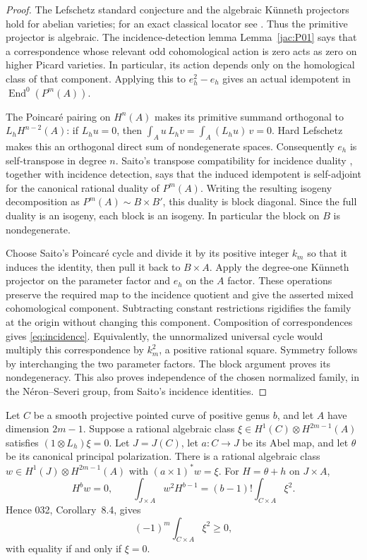 \begin{proof}
The Lefschetz standard conjecture and the algebraic K\"unneth projectors
hold for abelian varieties; for an exact classical locator see
\cite[Theorem~2A11]{Kleiman68}. Thus the primitive projector is algebraic.
The incidence-detection lemma Lemma~\ref{jac:P01} says that a correspondence
whose relevant odd cohomological action is zero acts as zero on higher
Picard varieties. In particular, its action depends only on the
homological class of that component. Applying this to $e_h^2-e_h$ gives
an actual idempotent in $\operatorname{End}^0(P^m(A))$.

The Poincar\'e pairing on $H^n(A)$ makes its primitive summand orthogonal
to $L_hH^{n-2}(A)$: if $L_hu=0$, then
$\int_Au\,L_hv=\int_A(L_hu)\,v=0$.
Hard Lefschetz makes this an orthogonal direct sum of nondegenerate
spaces. Consequently $e_h$ is self-transpose in degree $n$. Saito's
transpose compatibility for incidence duality
\cite[Proposition~4.4, especially (4.4.1)--(4.4.2)]{Saito1979}, together
with incidence detection, says that the induced idempotent is
self-adjoint for the canonical rational duality of $P^m(A)$.
Writing the resulting isogeny decomposition as
$P^m(A)\sim B\times B'$, this duality is block diagonal. Since the full
duality is an isogeny, each block is an isogeny. In particular the block
on $B$ is nondegenerate.

Choose Saito's Poincar\'e cycle and divide it by its positive integer
$k_m$ so that it induces the identity, then pull it back to $B\times A$.
Apply the degree-one K\"unneth projector on the parameter factor and
$e_h$ on the $A$ factor. These operations preserve the required map to
the incidence quotient and give the asserted mixed cohomological
component. Subtracting constant restrictions rigidifies the family at
the origin without changing this component. Composition of
correspondences gives \eqref{eq:incidence}. Equivalently, the
unnormalized universal cycle would multiply this correspondence by
$k_m^2$, a positive rational square. Symmetry follows by interchanging
the two parameter factors. The block argument proves its
nondegeneracy. This also proves independence of the chosen normalized
family, in the N\'eron--Severi group, from Saito's incidence identities.
\end{proof}

\begin{lemma}
\label{lem:curve-test}
Let $C$ be a smooth projective pointed curve of positive genus $b$, and
let $A$ have dimension $2m-1$. Suppose a rational algebraic class
$\xi\in H^1(C)\otimes H^{2m-1}(A)$ satisfies
$(1\otimes L_h)\xi=0$. Let $J=J(C)$, let
$a:C\longrightarrow J$ be its Abel map, and let $\theta$ be its canonical
principal polarization. There is a rational algebraic class
$w\in H^1(J)\otimes H^{2m-1}(A)$ with
$(a\times1)^*w=\xi$. For $H=\theta+h$ on $J\times A$,
\begin{equation}\label{eq:curve-transfer}
 H^bw=0,\qquad
 \int_{J\times A}w^2H^{b-1}
 =(b-1)!\int_{C\times A}\xi^2.
\end{equation}
Hence 032, Corollary~8.4, gives
\[
 (-1)^m\int_{C\times A}\xi^2\ge0,
\]
with equality if and only if $\xi=0$.
\end{lemma}


